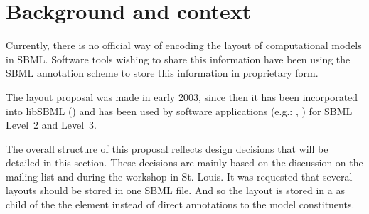 \section{Background and context}
\label{background}
Currently, there is no official way of encoding the layout of 
computational models in SBML. Software tools wishing to share this 
information have been using the SBML annotation scheme to store this 
information in proprietary form. 

The layout proposal was made in early 2003, since then it has been 
incorporated into libSBML (\cite{Gauges01082006}) and has been used by 
software applications (e.g.: \cite{COPASI}, \cite{sbw}) for SBML Level~2 
and Level~3. 

The overall structure of this proposal reflects design decisions that 
will be detailed in this section. These decisions are mainly based on 
the discussion on the mailing list and during the workshop in St. Louis. 
It was requested that several layouts should be stored in one SBML file. 
And so the layout is stored in a \ListOfLayouts as child of the the 
\Model element instead of direct annotations to the model constituents. 


